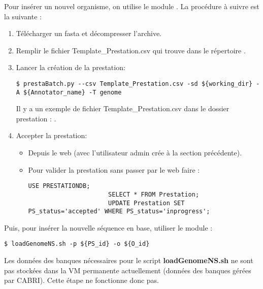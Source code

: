 Pour insérer un nouvel organisme, on utilise le module .
La procédure à suivre est la suivante :
\begin{enumerate}
    \item Télécharger un fasta et décompresser l'archive.
    \item Remplir le fichier Template\_Prestation.csv qui trouve dans le répertoire .
    \item Lancer la création de la prestation:
          \begin{lstlisting}[style=bash,gobble=14]
              $ prestaBatch.py --csv Template_Prestation.csv -sd ${working_dir} -A ${Annotator_name} -T genome
          \end{lstlisting}
          Il y a un exemple de fichier Template\_Prestation.csv dans le dossier prestation : .
    \item Accepter la prestation:
          \begin{itemize}
              \item Depuis le web (avec l'utilisateur admin crée à la section précédente).
              \item Pour valider la prestation sans passer par le web faire :
                    \begin{lstlisting}[style=SQL,gobble=22]
                      USE PRESTATIONDB;
                      SELECT * FROM Prestation;
                      UPDATE Prestation SET PS_status='accepted' WHERE PS_status='inprogress';
                  \end{lstlisting}
           \end{itemize}
\end{enumerate}

Puis, pour insérer la nouvelle séquence en base, utiliser le module :
\begin{lstlisting}[style=bash,gobble=4]
    $ loadGenomeNS.sh -p ${PS_id} -o ${O_id}
\end{lstlisting}

\begin{mycolorbox}
    Les données des banques nécessaires pour le script \textbf{loadGenomeNS.sh} ne sont pas stockées dans la VM permanente actuellement (données des banques gérées par CABRI).
    Cette étape ne fonctionne donc pas.
\end{mycolorbox}

